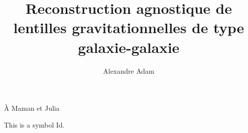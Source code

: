 \documentclass[
  normalmargins,
  11pt,
  openany,
  onehalfspacing,
]{ut-thesis}
\author{Alexandre Adam}
\title{Reconstruction agnostique de lentilles gravitationnelles de type galaxie-galaxie}
\begin{document}
  \frontmatter
    \maketitle

    \begin{resume}
    \end{resume}
    \begin{abstract}
    \end{abstract}

    \tableofcontents
    \listoftables
    \listoffigures
    \printglossaries

        \clearpage
    \begin{dedication}
      À Maman et Julia
    \end{dedication}
    \begin{acknowledgements}
            

           



            
    \end{acknowledgements}
  \mainmatter
    

    This is a symbol \gls{Id}.


  \appendix
  \backmatter

  
\end{document}
